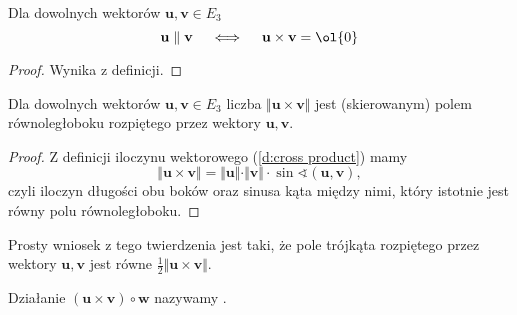 \begin{fact}
    Dla dowolnych wektorów $\mathbf{u}, \mathbf{v} \in E_3$
    \[ \mathbf{u} \parallel \mathbf{v} \quad \iff \quad \mathbf{u} \times \mathbf{v} = \ol{0} \]
\end{fact}
\begin{proof}
    Wynika z definicji.
\end{proof}

\begin{theorem}
    \label{t:area of parallelogram}
    Dla dowolnych wektorów $\mathbf{u}, \mathbf{v} \in E_3$ liczba $\Vert\mathbf{u}\times\mathbf{v}\Vert$ jest (skierowanym) polem równoległoboku rozpiętego przez wektory $\mathbf{u}, \mathbf{v}$.
\end{theorem}
\begin{proof}
    Z definicji iloczynu wektorowego (\ref{d:cross product}) mamy
    \[ \Vert\mathbf{u}\times\mathbf{v}\Vert = \Vert\mathbf{u}\Vert\cdot\Vert\mathbf{v}\Vert\cdot\sin\sphericalangle(\mathbf{u}, \mathbf{v}), \]
    czyli iloczyn długości obu boków oraz sinusa kąta między nimi, który istotnie jest równy polu równoległoboku.
\end{proof}

Prosty wniosek z tego twierdzenia jest taki, że pole trójkąta rozpiętego przez wektory $\mathbf{u}, \mathbf{v}$ jest równe $\frac{1}{2}\Vert\mathbf{u}\times\mathbf{v}\Vert$.

Działanie $(\mathbf{u}\times\mathbf{v}) \circ \mathbf{w}$ nazywamy .

